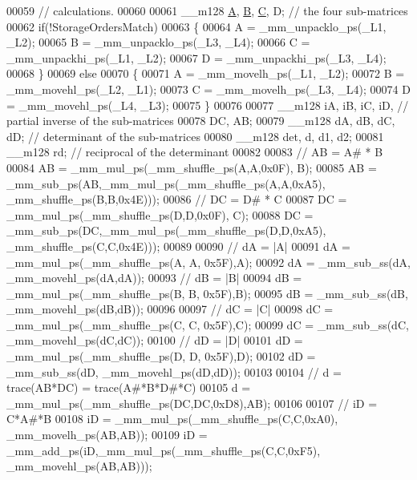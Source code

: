 \begin{DoxyCode}
00059     \textcolor{comment}{// calculations.}
00060 
00061     \_\_m128 \hyperlink{group___core___module_class_eigen_1_1_matrix}{A}, \hyperlink{group___core___module_class_eigen_1_1_matrix}{B}, \hyperlink{group___core___module}{C}, D; \textcolor{comment}{// the four sub-matrices}
00062     \textcolor{keywordflow}{if}(!StorageOrdersMatch)
00063     \{
00064       A = \_mm\_unpacklo\_ps(\_L1, \_L2);
00065       B = \_mm\_unpacklo\_ps(\_L3, \_L4);
00066       C = \_mm\_unpackhi\_ps(\_L1, \_L2);
00067       D = \_mm\_unpackhi\_ps(\_L3, \_L4);
00068     \}
00069     \textcolor{keywordflow}{else}
00070     \{
00071       A = \_mm\_movelh\_ps(\_L1, \_L2);
00072       B = \_mm\_movehl\_ps(\_L2, \_L1);
00073       C = \_mm\_movelh\_ps(\_L3, \_L4);
00074       D = \_mm\_movehl\_ps(\_L4, \_L3);
00075     \}
00076 
00077     \_\_m128 iA, iB, iC, iD,                 \textcolor{comment}{// partial inverse of the sub-matrices}
00078             DC, AB;
00079     \_\_m128 dA, dB, dC, dD;                 \textcolor{comment}{// determinant of the sub-matrices}
00080     \_\_m128 det, d, d1, d2;
00081     \_\_m128 rd;                             \textcolor{comment}{// reciprocal of the determinant}
00082 
00083     \textcolor{comment}{//  AB = A# * B}
00084     AB = \_mm\_mul\_ps(\_mm\_shuffle\_ps(A,A,0x0F), B);
00085     AB = \_mm\_sub\_ps(AB,\_mm\_mul\_ps(\_mm\_shuffle\_ps(A,A,0xA5), \_mm\_shuffle\_ps(B,B,0x4E)));
00086     \textcolor{comment}{//  DC = D# * C}
00087     DC = \_mm\_mul\_ps(\_mm\_shuffle\_ps(D,D,0x0F), C);
00088     DC = \_mm\_sub\_ps(DC,\_mm\_mul\_ps(\_mm\_shuffle\_ps(D,D,0xA5), \_mm\_shuffle\_ps(C,C,0x4E)));
00089 
00090     \textcolor{comment}{//  dA = |A|}
00091     dA = \_mm\_mul\_ps(\_mm\_shuffle\_ps(A, A, 0x5F),A);
00092     dA = \_mm\_sub\_ss(dA, \_mm\_movehl\_ps(dA,dA));
00093     \textcolor{comment}{//  dB = |B|}
00094     dB = \_mm\_mul\_ps(\_mm\_shuffle\_ps(B, B, 0x5F),B);
00095     dB = \_mm\_sub\_ss(dB, \_mm\_movehl\_ps(dB,dB));
00096 
00097     \textcolor{comment}{//  dC = |C|}
00098     dC = \_mm\_mul\_ps(\_mm\_shuffle\_ps(C, C, 0x5F),C);
00099     dC = \_mm\_sub\_ss(dC, \_mm\_movehl\_ps(dC,dC));
00100     \textcolor{comment}{//  dD = |D|}
00101     dD = \_mm\_mul\_ps(\_mm\_shuffle\_ps(D, D, 0x5F),D);
00102     dD = \_mm\_sub\_ss(dD, \_mm\_movehl\_ps(dD,dD));
00103 
00104     \textcolor{comment}{//  d = trace(AB*DC) = trace(A#*B*D#*C)}
00105     d = \_mm\_mul\_ps(\_mm\_shuffle\_ps(DC,DC,0xD8),AB);
00106 
00107     \textcolor{comment}{//  iD = C*A#*B}
00108     iD = \_mm\_mul\_ps(\_mm\_shuffle\_ps(C,C,0xA0), \_mm\_movelh\_ps(AB,AB));
00109     iD = \_mm\_add\_ps(iD,\_mm\_mul\_ps(\_mm\_shuffle\_ps(C,C,0xF5), \_mm\_movehl\_ps(AB,AB)));

\end{DoxyCode}
